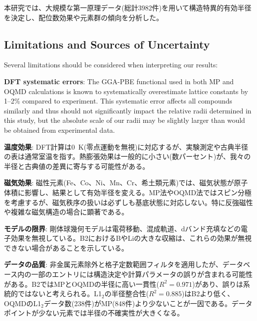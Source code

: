\documentclass[a4paper,10pt,5p]{elsarticle}
\begin{document}
本研究では、大規模な第一原理データ(総計3982件)を用いて構造特異的有効半径を決定し、配位数効果や元素群の傾向を分析した。



\subsection{Limitations and Sources of Uncertainty}

Several limitations should be considered when interpreting our results:

\textbf{DFT systematic errors}: 
The GGA-PBE functional used in both MP and OQMD calculations is known to systematically overestimate lattice constants by 1--2\% compared to experiment. This systematic error affects all compounds similarly and thus should not significantly impact the relative radii determined in this study, but the absolute scale of our radii may be slightly larger than would be obtained from experimental data.

\textbf{温度効果}: DFT計算は0~K(零点運動を無視)に対応するが、実験測定や古典半径の表は通常室温を指す。熱膨張効果は一般的に小さい(数パーセント)が、我々の半径と古典値の差異に寄与する可能性がある。

\textbf{磁気効果}: 磁性元素(Fe、Co、Ni、Mn、Cr、希土類元素)では、磁気状態が原子体積に影響し、結果として有効半径を変える。MP法やOQMD法ではスピン分極を考慮するが、磁気秩序の扱いは必ずしも基底状態に対応しない。特に反強磁性や複雑な磁気構造の場合に顕著である。

\textbf{モデルの限界}: 剛体球幾何モデルは電荷移動、混成軌道、dバンド充填などの電子効果を無視している。B2におけるBやLiの大きな収縮は、これらの効果が無視できない場合があることを示している。

\textbf{データの品質}: 非金属元素除外と格子定数範囲フィルタを適用したが、データベース内の一部のエントリには構造決定や計算パラメータの誤りが含まれる可能性がある。B2ではMPとOQMDの半径に高い一貫性($R^2 = 0.971$)があり、誤りは系統的ではないと考えられる。L1$_2$の半径整合性($R^2 = 0.885$)はB2より低く、OQMDのL1$_2$データ数(238件)がMP(848件)より少ないことが一因である。データポイントが少ない元素では半径の不確実性が大きくなる。
\end{document}
